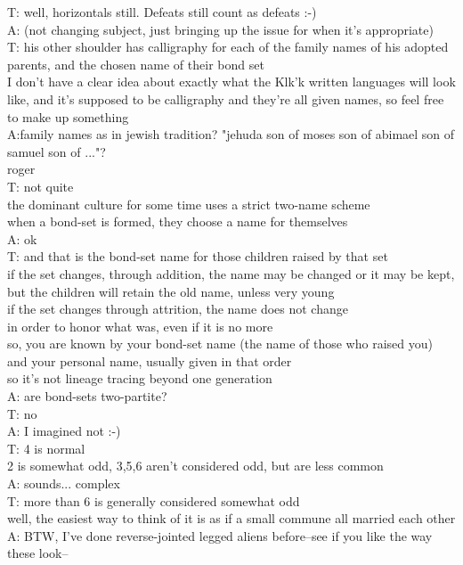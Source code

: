 T: well, horizontals still. Defeats still count as defeats :-)\\
A: (not changing subject, just bringing up the issue for when it's appropriate)\\
T: his other shoulder has calligraphy for each of the family names of his adopted parents, and the chosen name of their bond set\\
I don't have a clear idea about exactly what the Klk'k written languages will look like, and it's supposed to be calligraphy and they're all given names, so feel free to make up something\\
A:family names as in jewish tradition? "jehuda son of moses son of abimael son of samuel son of ..."?\\
roger\\
T: not quite\\
the dominant culture for some time uses a strict two-name scheme\\
when a bond-set is formed, they choose a name for themselves\\
A: ok\\
T: and that is the bond-set name for those children raised by that set\\
if the set changes, through addition, the name may be changed or it may be kept, but the children will retain the old name, unless very young\\
if the set changes through attrition, the name does not change\\
in order to honor what was, even if it is no more\\
so, you are known by your bond-set name (the name of those who raised you) and your personal name, usually given in that order\\
so it's not lineage tracing beyond one generation\\
A: are bond-sets two-partite?\\
T: no\\
A: I imagined not :-)\\
T: 4 is normal\\
2 is somewhat odd, 3,5,6 aren't considered odd, but are less common\\
A: sounds... complex\\
T: more than 6 is generally considered somewhat odd\\
well, the easiest way to think of it is as if a small commune all married each other\\
A: BTW, I've done reverse-jointed legged aliens before--see if you like the way these look-- \\
